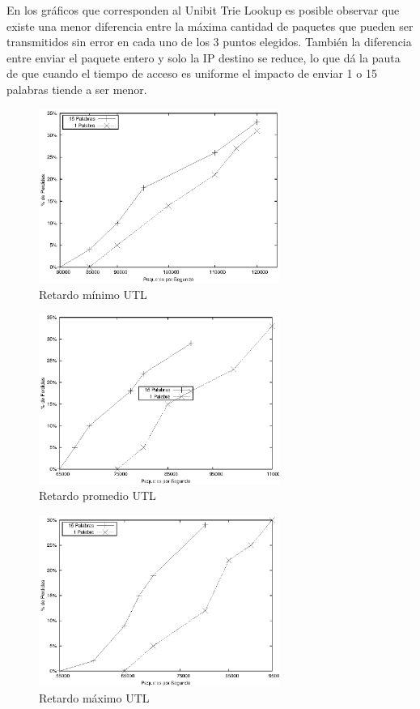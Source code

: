 En los gráficos que corresponden al Unibit Trie Lookup es posible observar que existe una menor diferencia entre la máxima cantidad de paquetes que pueden ser transmitidos sin error en cada uno de los 3 puntos elegidos. También la diferencia entre enviar el paquete entero y solo la IP destino se reduce, lo que dá la pauta de que cuando el tiempo de acceso es uniforme el impacto de enviar 1 o 15 palabras tiende a ser menor.
\newpage
\begin{figure}[!h]
  \centering
	\includegraphics[width=0.7\textwidth]{5-resultados/graf/utlmin.eps}
  \caption{Retardo mínimo UTL}
  \label{fig}
\end{figure}
\begin{figure}[!h]
  \centering
	\includegraphics[width=0.7\textwidth]{5-resultados/graf/utlprom.eps}
  \caption{Retardo promedio UTL}
  \label{fig}
\end{figure}
\begin{figure}[!h]
  \centering
	\includegraphics[width=0.7\textwidth]{5-resultados/graf/utlmax.eps}
  \caption{Retardo máximo UTL}
  \label{fig}
\end{figure}

